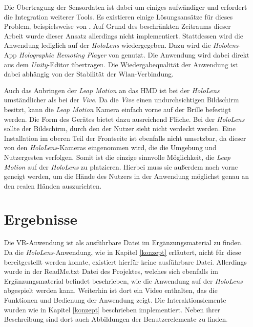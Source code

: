 Die Übertragung der Sensordaten ist dabei um einiges aufwändiger und erfordert die Integration weiterer Tools. Es existieren einige Lösungsansätze für dieses Problem, beispielsweise von \cite{hololensGithub}. Auf Grund des beschränkten Zeitraums dieser Arbeit wurde dieser Ansatz allerdings nicht implementiert.
Stattdessen wird die Anwendung lediglich auf der \textit{HoloLens} wiedergegeben. Dazu wird die \textit{Hololens}-App \textit{Holographic Remoting Player} von \cite{remoteApp} genutzt. Die Anwendung wird dabei direkt aus dem \textit{Unity}-Editor übertragen.
Die Wiedergabequalität der Anwendung ist dabei abhängig von der Stabilität der Wlan-Verbindung.

Auch das Anbringen der \textit{Leap Motion} an das HMD ist bei der \textit{HoloLens} umständlicher als bei der \textit{Vive}. 
Da die \textit{Vive} einen undurchsichtigen Bildschirm besitzt, kann die \textit{Leap Motion} Kamera einfach vorne auf der Brille befestigt werden. Die Form des Gerätes bietet dazu ausreichend Fläche.
Bei der \textit{HoloLens} sollte der Bildschirm, durch den der Nutzer sieht nicht verdeckt werden. Eine Installation im oberen Teil der Frontseite ist ebenfalls nicht umsetzbar, da dieser von den \textit{HoloLens}-Kameras eingenommen wird, die die Umgebung und Nutzergesten verfolgen.
Somit ist die einzige sinnvolle Möglichkeit, die \textit{Leap Motion} auf der \textit{HoloLens} zu platzieren. Hierbei muss sie außerdem nach vorne geneigt werden, um die Hände des Nutzers in der Anwendung möglichst genau an den realen Händen auszurichten. 



\section{Ergebnisse}
\label{ergebnisse}

Die VR-Anwendung ist als ausführbare Datei im Ergänzungsmaterial zu finden. Da die \textit{HoloLens}-Anwendung, wie in Kapitel \ref{konzept} erläutert, nicht für diese bereitgestellt werden konnte, existiert hierfür keine ausführbare Datei. Allerdings wurde in der ReadMe.txt Datei des Projektes, welches sich ebenfalls im Ergänzungsmaterial befindet beschrieben, wie die Anwendung auf der \textit{HoloLens} abgespielt werden kann. 
Weiterhin ist dort ein Video enthalten, das die Funktionen und Bedienung der Anwendung zeigt.
Die Interaktionslemente wurden wie in Kapitel \ref{konzept} beschrieben implementiert. Neben ihrer Beschreibung sind dort auch Abbildungen der Benutzerelemente zu finden. 


